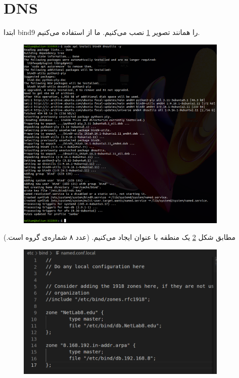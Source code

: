 \documentclass{article}
\begin{document}
\section{DNS}
ابتدا bind9 را همانند تصویر \ref{fig:4} نصب می‌کنیم. ما از 
استفاده می‌کنیم.

\begin{figure}[h!]
	\centering
	\includegraphics[width=0.9\textwidth]{src/4.png}
	\caption{}
	\label{fig:4}
\end{figure}

مطابق شکل \ref{fig:5} یک منطقه با عنوان  ایجاد می‌کنیم. (عدد ۸ شماره‌ی گروه است.)

\begin{figure}[h!]
	\centering
	\includegraphics[width=0.9\textwidth]{src/5.png}
	\caption{}
	\label{fig:5}
\end{figure}
\end{document}
